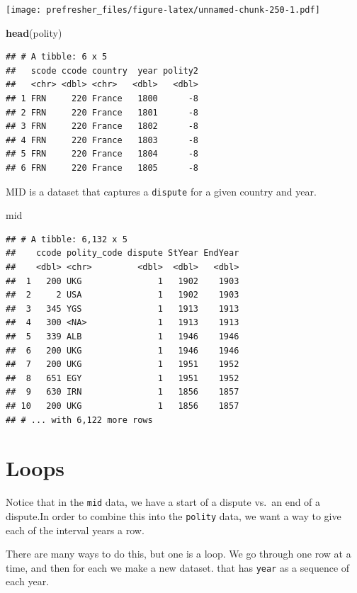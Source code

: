 \documentclass[]{book}
\newenvironment{Shaded}{\begin{snugshade}}{\end{snugshade}}
\newcommand{\KeywordTok}[1]{\textcolor[rgb]{0.13,0.29,0.53}{\textbf{#1}}}
\newcommand{\NormalTok}[1]{#1}
\theoremstyle{definition}
\theoremstyle{definition}
\theoremstyle{definition}
\theoremstyle{remark}
\begin{document}
\texttt{[image: prefresher\_files/figure-latex/unnamed-chunk-250-1.pdf]}

\begin{Shaded}
\begin{Highlighting}[]
\KeywordTok{head}\NormalTok{(polity)}
\end{Highlighting}
\end{Shaded}

\begin{verbatim}
## # A tibble: 6 x 5
##   scode ccode country  year polity2
##   <chr> <dbl> <chr>   <dbl>   <dbl>
## 1 FRN     220 France   1800      -8
## 2 FRN     220 France   1801      -8
## 3 FRN     220 France   1802      -8
## 4 FRN     220 France   1803      -8
## 5 FRN     220 France   1804      -8
## 6 FRN     220 France   1805      -8
\end{verbatim}

MID is a dataset that captures a \texttt{dispute} for a given country
and year.

\begin{Shaded}
\begin{Highlighting}[]
\NormalTok{mid}
\end{Highlighting}
\end{Shaded}

\begin{verbatim}
## # A tibble: 6,132 x 5
##    ccode polity_code dispute StYear EndYear
##    <dbl> <chr>         <dbl>  <dbl>   <dbl>
##  1   200 UKG               1   1902    1903
##  2     2 USA               1   1902    1903
##  3   345 YGS               1   1913    1913
##  4   300 <NA>              1   1913    1913
##  5   339 ALB               1   1946    1946
##  6   200 UKG               1   1946    1946
##  7   200 UKG               1   1951    1952
##  8   651 EGY               1   1951    1952
##  9   630 IRN               1   1856    1857
## 10   200 UKG               1   1856    1857
## # ... with 6,122 more rows
\end{verbatim}

\section{Loops}\label{loops}

Notice that in the \texttt{mid} data, we have a start of a dispute
vs.~an end of a dispute.In order to combine this into the
\texttt{polity} data, we want a way to give each of the interval years a
row.

There are many ways to do this, but one is a loop. We go through one row
at a time, and then for each we make a new dataset. that has
\texttt{year} as a sequence of each year.
\end{document}
